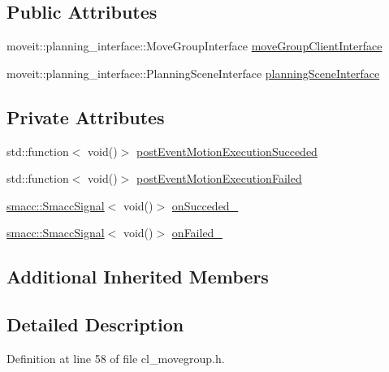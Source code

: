\subsection*{Public Attributes}
\begin{DoxyCompactItemize}
\item 
moveit\+::planning\+\_\+interface\+::\+Move\+Group\+Interface \hyperlink{classsm__moveit_1_1cl__movegroup_1_1ClMoveGroup_a23acf6883455566dbab30e4367c2144d}{move\+Group\+Client\+Interface}
\item 
moveit\+::planning\+\_\+interface\+::\+Planning\+Scene\+Interface \hyperlink{classsm__moveit_1_1cl__movegroup_1_1ClMoveGroup_a26b5c9e0aef1cd67ee977a756b69cf76}{planning\+Scene\+Interface}
\end{DoxyCompactItemize}
\subsection*{Private Attributes}
\begin{DoxyCompactItemize}
\item 
std\+::function$<$ void()$>$ \hyperlink{classsm__moveit_1_1cl__movegroup_1_1ClMoveGroup_a1fde35aad5c4d3c0461d4b75553e6862}{post\+Event\+Motion\+Execution\+Succeded}
\item 
std\+::function$<$ void()$>$ \hyperlink{classsm__moveit_1_1cl__movegroup_1_1ClMoveGroup_a742a3504755ab7bae290c87290d2bf3f}{post\+Event\+Motion\+Execution\+Failed}
\item 
\hyperlink{classsmacc_1_1SmaccSignal}{smacc\+::\+Smacc\+Signal}$<$ void()$>$ \hyperlink{classsm__moveit_1_1cl__movegroup_1_1ClMoveGroup_ad0a02fb564967bae0808c966dd1e3c36}{on\+Succeded\+\_\+}
\item 
\hyperlink{classsmacc_1_1SmaccSignal}{smacc\+::\+Smacc\+Signal}$<$ void()$>$ \hyperlink{classsm__moveit_1_1cl__movegroup_1_1ClMoveGroup_ab4d03a5e64608a13458d740ce1536c8e}{on\+Failed\+\_\+}
\end{DoxyCompactItemize}
\subsection*{Additional Inherited Members}


\subsection{Detailed Description}


Definition at line 58 of file cl\+\_\+movegroup.\+h.



